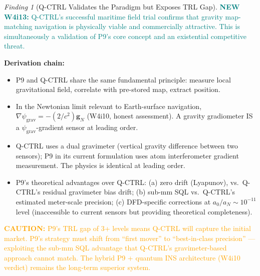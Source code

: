 \documentclass[11pt]{article}
\theoremstyle{definition}
\theoremstyle{remark}
\newtheorem{finding}[theorem]{Finding}
\newcommand{\psigrav}{\psi_{\mathrm{grav}}}
\newcommand{\caution}[1]{\textcolor{orange}{\textbf{CAUTION:} #1}}
\newcommand{\newfinding}[1]{\textcolor{teal}{\textbf{NEW W4i13:} #1}}
\begin{document}
\begin{finding}[Q-CTRL Validates the Paradigm but Exposes TRL Gap]
\label{find:qctrl-threat}
\newfinding{Q-CTRL's successful maritime field trial confirms that gravity
map-matching navigation is physically viable and commercially attractive.
This is simultaneously a validation of P9's core concept and an existential
competitive threat.}

\textbf{Derivation chain:}
\begin{itemize}[nosep]
\item P9 and Q-CTRL share the same fundamental principle: measure local
  gravitational field, correlate with pre-stored map, extract position.
\item In the Newtonian limit relevant to Earth-surface navigation,
  $\nabla\psigrav = -(2/c^2)\mathbf{g}_N$ (W4i10, honest assessment).
  A gravity gradiometer IS a $\psigrav$-gradient sensor at leading order.
\item Q-CTRL uses a dual gravimeter (vertical gravity difference between
  two sensors); P9 in its current formulation uses atom interferometer
  gradient measurement. The physics is identical at leading order.
\item P9's theoretical advantages over Q-CTRL: (a) zero drift (Lyapunov),
  vs.\ Q-CTRL's residual gravimeter bias drift; (b) sub-mm SQL
  vs.\ Q-CTRL's estimated meter-scale precision; (c) DFD-specific
  corrections at $a_0/a_N \sim 10^{-11}$ level (inaccessible to current
  sensors but providing theoretical completeness).
\end{itemize}

\caution{P9's TRL gap of 3+ levels means Q-CTRL will capture the
initial market. P9's strategy must shift from ``first mover'' to
``best-in-class precision'' --- exploiting the sub-mm SQL advantage
that Q-CTRL's gravimeter-based approach cannot match. The hybrid
P9 + quantum INS architecture (W4i10 verdict) remains the long-term
superior system.}
\end{finding}
\end{document}
